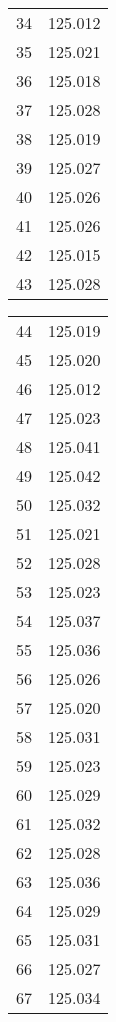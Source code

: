\begin{multicols}{3}
\begin{table}[H]
\begin{tabular}{|c|c|}
            34 & 125.012 \\
            35 & 125.021 \\
            36 & 125.018 \\
            37 & 125.028 \\
            38 & 125.019 \\
            39 & 125.027 \\
            40 & 125.026 \\
            41 & 125.026 \\
            42 & 125.015 \\
            43 & 125.028 \\
            \hline
        \end{tabular}
    \end{table}
    \columnbreak
    \begin{table}[H]
        \centering
        \begin{tabular}{|c|c|}
            \hline
            44 & 125.019 \\
            45 & 125.020 \\
            46 & 125.012 \\
            47 & 125.023 \\
            48 & 125.041 \\
            49 & 125.042 \\
            50 & 125.032 \\
            51 & 125.021 \\
            52 & 125.028 \\
            53 & 125.023 \\
            54 & 125.037 \\
            55 & 125.036 \\
            56 & 125.026 \\
            57 & 125.020 \\
            58 & 125.031 \\
            59 & 125.023 \\
            60 & 125.029 \\
            61 & 125.032 \\
            62 & 125.028 \\
            63 & 125.036 \\
            64 & 125.029 \\
            65 & 125.031 \\
            66 & 125.027 \\
            67 & 125.034 \\

\end{tabular}
\end{table}
\end{multicols}
